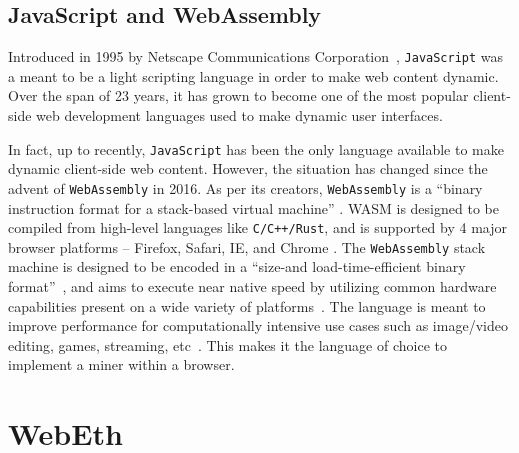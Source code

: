 \documentclass[runningheads]{llncs}
\newcommand{\trishita}[1]{}%
\begin{document}
\subsection{JavaScript and WebAssembly}
Introduced in 1995 by Netscape Communications Corporation~\cite{js}, \verb|JavaScript| was a meant to be a light scripting language in order to  make web content dynamic. Over the span of 23 years, it has grown to become one of the most popular client-side web development languages used to make dynamic user interfaces. 

In fact, up to recently, \verb|JavaScript| has been the only language available to make dynamic client-side web content. However, the situation has changed since the advent of \verb|WebAssembly| in 2016. As per its creators, \verb|WebAssembly| is a ``binary instruction format for a stack-based virtual machine'' \cite{webAssembly}. WASM is designed to be compiled from high-level languages like \verb|C/C++/Rust|, and is supported by 4 major browser platforms -- Firefox, Safari, IE, and Chrome \cite{webAssembly}. The \verb|WebAssembly| stack machine is designed to be encoded in a ``size-and load-time-efficient binary format''~\cite{webAssembly}, and aims to execute near native speed by utilizing common hardware capabilities present on a wide variety of platforms~\cite{webAssembly}. The language is meant to improve performance for computationally intensive use cases such as image/video editing, games, streaming, etc~\cite{webAssembly}. This makes it the language of choice to implement a miner within a browser. 


\section{WebEth}
\label{sec:webeth}
\end{document}
